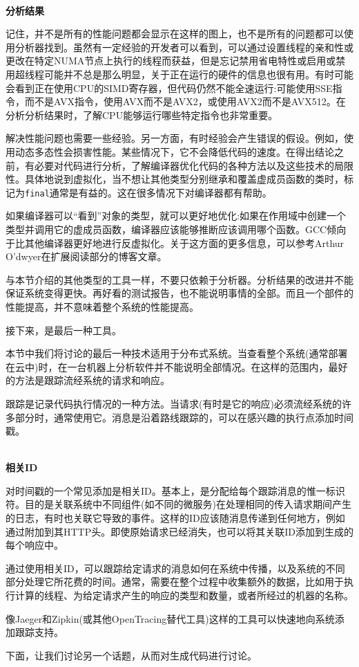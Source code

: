 \hspace*{\fill} \\ %
\noindent
\textbf{分析结果}

记住，并不是所有的性能问题都会显示在这样的图上，也不是所有的问题都可以使用分析器找到。虽然有一定经验的开发者可以看到，可以通过设置线程的亲和性或更改在特定NUMA节点上执行的线程而获益，但是忘记禁用省电特性或启用或禁用超线程可能并不总是那么明显，关于正在运行的硬件的信息也很有用。有时可能会看到正在使用CPU的SIMD寄存器，但代码仍然不能全速运行:可能使用SSE指令，而不是AVX指令，使用AVX而不是AVX2，或使用AVX2而不是AVX512。在分析分析结果时，了解CPU能够运行哪些特定指令也非常重要。

解决性能问题也需要一些经验。另一方面，有时经验会产生错误的假设。例如，使用动态多态性会损害性能。某些情况下，它不会降低代码的速度。在得出结论之前，有必要对代码进行分析，了解编译器优化代码的各种方法以及这些技术的局限性。具体地说到虚拟化，当不想让其他类型分别继承和覆盖虚成员函数的类时，标记为\texttt{final}通常是有益的。这在很多情况下对编译器都有帮助。

如果编译器可以“看到”对象的类型，就可以更好地优化:如果在作用域中创建一个类型并调用它的虚成员函数，编译器应该能够推断应该调用哪个函数。GCC倾向于比其他编译器更好地进行反虚拟化。关于这方面的更多信息，可以参考Arthur O’dwyer在扩展阅读部分的博客文章。

与本节介绍的其他类型的工具一样，不要只依赖于分析器。分析结果的改进并不能保证系统变得更快。再好看的测试报告，也不能说明事情的全部。而且一个部件的性能提高，并不意味着整个系统的性能提高。

接下来，是最后一种工具。


本节中我们将讨论的最后一种技术适用于分布式系统。当查看整个系统(通常部署在云中)时，在一台机器上分析软件并不能说明全部情况。在这样的范围内，最好的方法是跟踪流经系统的请求和响应。

跟踪是记录代码执行情况的一种方法。当请求(有时是它的响应)必须流经系统的许多部分时，通常使用它。消息是沿着路线跟踪的，可以在感兴趣的执行点添加时间戳。

\hspace*{\fill} \\ %
\noindent
\textbf{相关ID}

对时间戳的一个常见添加是相关ID。基本上，是分配给每个跟踪消息的惟一标识符。目的是关联系统中不同组件(如不同的微服务)在处理相同的传入请求期间产生的日志，有时也关联它导致的事件。这样的ID应该随消息传递到任何地方，例如通过附加到其HTTP头。即使原始请求已经消失，也可以将其关联ID添加到生成的每个响应中。

通过使用相关ID，可以跟踪给定请求的消息如何在系统中传播，以及系统的不同部分处理它所花费的时间。通常，需要在整个过程中收集额外的数据，比如用于执行计算的线程、为给定请求产生的响应的类型和数量，或者所经过的机器的名称。

像Jaeger和Zipkin(或其他OpenTracing替代工具)这样的工具可以快速地向系统添加跟踪支持。

下面，让我们讨论另一个话题，从而对生成代码进行讨论。





